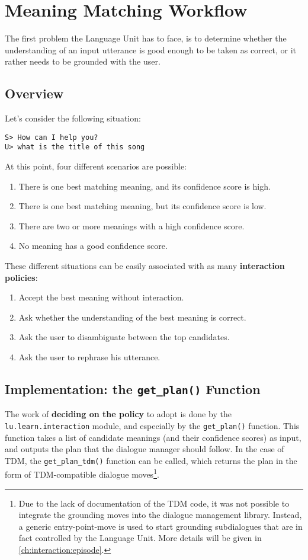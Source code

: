 \section{Meaning Matching Workflow} \label{ch:interaction:mmw}
The first problem the Language Unit has to face, is to determine whether the understanding of an input utterance is good enough to be taken as correct, or it rather needs to be grounded with the user.

\subsection{Overview}
Let's consider the following situation:

\texttt{S> How can I help you? \\
U> what is the title of this song}

At this point, four different scenarios are possible:
\begin{enumerate}
	\item There is one best matching meaning, and its confidence score is high.
	\item There is one best matching meaning, but its confidence score is low.
	\item There are two or more meanings with a high confidence score.
	\item No meaning has a good confidence score.
\end{enumerate}
These different situations can be easily associated with as many \textbf{interaction policies}:
\begin{enumerate}
	\item Accept the best meaning without interaction.
	\item Ask whether the understanding of the best meaning is correct.
	\item Ask the user to disambiguate between the top candidates.
	\item Ask the user to rephrase his utterance.
\end{enumerate}

\subsection{Implementation: the \texttt{get\_plan()} Function} \label{ch:interaction:mmw:getplan}
The work of \textbf{deciding on the policy} to adopt is done by the \texttt{lu.learn.interaction} module, and especially by the \texttt{get\_plan()} function. This function takes a list of candidate meanings (and their confidence scores) as input, and outputs the plan that the dialogue manager should follow. In the case of TDM, the \texttt{get\_plan\_tdm()} function can be called, which returns the plan in the form of TDM-compatible dialogue moves\footnote{Due to the lack of documentation of the TDM code, it was not possible to integrate the grounding moves into the dialogue management library. Instead, a generic entry-point-move is used to start grounding subdialogues that are in fact controlled by the Language Unit. More details will be given in \ref{ch:interaction:episode}.}.

